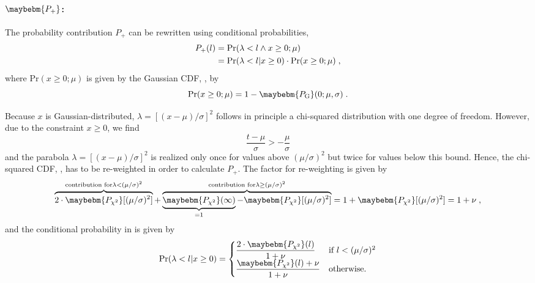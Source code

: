 \documentclass[a4paper]{article}
\newcommand*\Prob{\mathrm{Pr}}
\newcommand*\PG{\maybebm{P_\mathrm{G}}\xspace}
\newcommand*\Pchi{\maybebm{P_{\chi^2}}\xspace}
\begin{document}
\paragraph{$\maybebm{P_+}$:}
The probability contribution $P_+$ can be rewritten using conditional
probabilities,
%
\begin{align}
  P_+(l)
  & = \Prob(\lambda < l \wedge x \geq 0; \mu)
  \nonumber
  \\
  & = \Prob(\lambda < l | x \geq 0) \cdot \Prob(x \geq 0; \mu)
  \label{eq:p:plus:conditional}
  \fcomma
\end{align}
%
where $\Prob(x \geq 0; \mu)$ is given by the Gaussian CDF, \PG, by
%
\begin{equation}
  \label{eq:p:plus:prior}
  \Prob(x \geq 0; \mu) = 1 - \PG(0; \mu, \sigma)
  \fstop
\end{equation}
%

Because $x$ is Gaussian-distributed, 
$\lambda = [(x-\mu)/\sigma]^2$ follows in principle a
chi-squared distribution with one degree of freedom. However, due to the
constraint $x \geq 0$, we find
%
\begin{equation*}
  \frac{t-\mu}{\sigma} > -\frac{\mu}{\sigma}
\end{equation*}
%
and the parabola $\lambda=[(x-\mu)/\sigma]^2$ is realized only once
for values above $(\mu/\sigma)^2$ but twice for values below this
bound. Hence, the chi-squared CDF, \Pchi, has to be re-weighted
in order to calculate $P_+$. The factor for re-weighting is given by
\begin{equation*}
  \overbrace{2 \cdot \Pchi[(\mu/\sigma)^2]}^{\text{contribution
  for} \lambda < (\mu/\sigma)^2} +
  \overbrace{
    \underbrace{\Pchi(\infty)}_{=1} - \Pchi[(\mu/\sigma)^2]
}^{\text{contribution
  for} \lambda \geq (\mu/\sigma)^2}
  = 1 + \Pchi[(\mu/\sigma)^2]
  = 1 + \nu
     \fcomma
\end{equation*}
and the conditional probability in  is given
by
%
\begin{equation}
  \label{eq:p:plus:conditional:only}
  \Prob(\lambda < l | x \geq 0) =
  \begin{cases}
    \displaystyle
    \frac{2 \cdot \Pchi(l)}{1+\nu} & \text{if } l < (\mu/\sigma)^2
    \\
    \displaystyle
    \frac{\Pchi(l) + \nu}{1 + \nu} & \text{otherwise.}
  \end{cases}
\end{equation}
%
\end{document}
